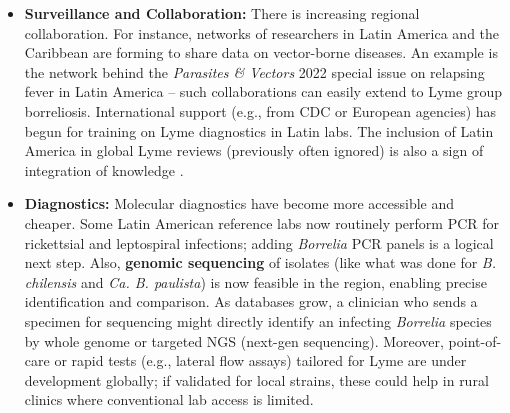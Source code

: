 \documentclass[11pt,letterpaper]{article}
\begin{document}
\begin{itemize}
    \item \textbf{Surveillance and Collaboration:} There is increasing regional collaboration. For instance, networks of researchers in Latin America and the Caribbean are forming to share data on vector-borne diseases. An example is the network behind the \textit{Parasites \& Vectors} 2022 special issue on relapsing fever in Latin America \citep{Colunga-Salas2022d} – such collaborations can easily extend to Lyme group borreliosis. International support (e.g., from CDC or European agencies) has begun for training on Lyme diagnostics in Latin labs. The inclusion of Latin America in global Lyme reviews (previously often ignored) is also a sign of integration of knowledge \citep{Labruna2024e}.

    \item \textbf{Diagnostics:} Molecular diagnostics have become more accessible and cheaper. Some Latin American reference labs now routinely perform PCR for rickettsial and leptospiral infections; adding \textit{Borrelia} PCR panels is a logical next step. Also, \textbf{genomic sequencing} of isolates (like what was done for \textit{B. chilensis} and \textit{Ca. B. paulista}) is now feasible in the region, enabling precise identification and comparison. As databases grow, a clinician who sends a specimen for sequencing might directly identify an infecting \textit{Borrelia} species by whole genome or targeted NGS (next-gen sequencing). Moreover, point-of-care or rapid tests (e.g., lateral flow assays) tailored for Lyme are under development globally; if validated for local strains, these could help in rural clinics where conventional lab access is limited.


\end{itemize}
\end{document}
